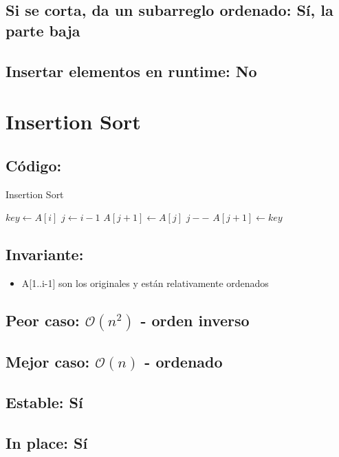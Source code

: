 \documentclass[a4paper]{article}
\begin{document}
\subsection{Si se corta, da un subarreglo ordenado: S\'i, la parte baja}
\subsection{Insertar elementos en runtime: No}
	
\newpage
\section{Insertion Sort}

\subsection{C\'odigo:}
\begin{algorithm}
\caption{Insertion Sort}\label{selection}
\begin{algorithmic}[1]
   	\State $key \gets A[i]$
	\State $j \gets i-1$
    	\State $A[j+1] \gets A[j]$
	\State $j --$
    \EndWhile
    \State $A[j+1] \gets key$
    \EndFor
\EndProcedure
\end{algorithmic}
\end{algorithm}

\subsection{Invariante:}
\begin{itemize}
	\item{A[1..i-1] son los originales y est\'an relativamente ordenados}
\end{itemize}

\subsection{Peor caso: $\mathcal{O}(n^{2})$ - orden inverso}
\subsection{Mejor caso: $\mathcal{O}(n)$ - ordenado}
\subsection{Estable: S\'i}
\subsection{In place: S\'i}
\end{document}
